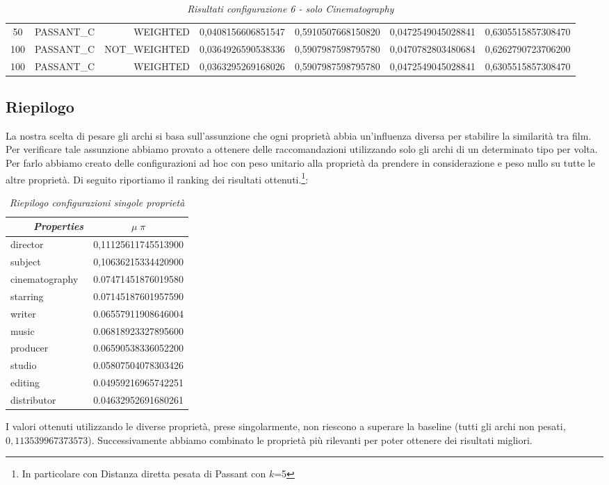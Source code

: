\begin{table}[H]
{\begin{tabular}{ c l r c c c c }
				50 &  PASSANT\_C &   WEIGHTED & 0,0408156606851547 & 0,5910507668150820 & 0,0472549045028841 & 0,6305515857308470 \\
				
				100 &  PASSANT\_C & NOT\_WEIGHTED & 0,0364926590538336 & 0,5907987598795780 & 0,0470782803480684 & 0,6262790723706200 \\
				
				100 &  PASSANT\_C &   WEIGHTED & 0,0363295269168026 & 0,5907987598795780 & 0,0472549045028841 & 0,6305515857308470 \\
			\bottomrule
		\end{tabular}  
	}
	\caption{\emph{Risultati configurazione 6 - solo Cinematography}}
\end{table}

\subsection{Riepilogo}
La nostra scelta di pesare gli archi si basa sull'assunzione che ogni proprietà abbia un'influenza diversa per stabilire la similarità tra film.
Per verificare tale assunzione abbiamo provato a ottenere delle raccomandazioni utilizzando solo gli archi di un determinato tipo per volta.
Per farlo abbiamo creato delle configurazioni ad hoc con peso unitario alla proprietà da prendere in considerazione e peso nullo su tutte le altre proprietà.
Di seguito riportiamo il ranking dei risultati ottenuti.\footnote{In particolare con Distanza diretta pesata di Passant con $k$=5}:
\begin{table}[H]
	\small
	\centering
	\begin{tabular}{l c}
		\textit{~~~~Properties} & \textit{$\mu\;\pi$}\\\hline
		director & 0,11125611745513900 \\
		subject & 0,10636215334420900 \\
		cinematography & 0.07471451876019580 \\
		starring & 0.07145187601957590 \\
		writer & 0.06557911908646004 \\
		music & 0.06818923327895600 \\
		producer & 0.06590538336052200 \\
		studio & 0.05807504078303426 \\
		editing	& 0.04959216965742251 \\
		distributor & 0.04632952691680261 \\
	\end{tabular}
	\caption{\emph{Riepilogo configurazioni singole proprietà}}
\end{table}
I valori ottenuti utilizzando le diverse proprietà, prese singolarmente, non riescono a superare la baseline (tutti gli archi non pesati, $0,113539967373573$).
Successivamente abbiamo combinato le proprietà più rilevanti per poter ottenere dei risultati migliori.

